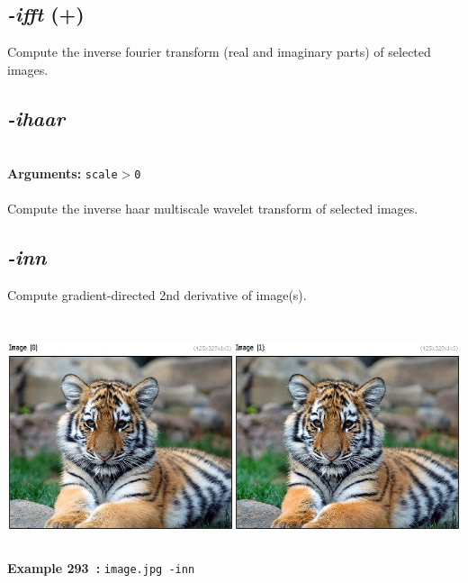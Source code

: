 \documentclass[a4paper,11pt,twoside]{book}
\begin{document}
\subsection{\emph{-ifft} (+)}\vspace*{-0.5em}
Compute the inverse fourier transform (real and imaginary parts) of selected images.


\subsection{\emph{-ihaar} }\vspace*{-0.5em}
~\\\textbf{Arguments: } 
{\small \texttt{scale$>$0}}\\~\\
Compute the inverse haar multiscale wavelet transform of selected images.


\subsection{\emph{-inn} }\vspace*{-0.5em}
Compute gradient-directed 2nd derivative of image(s).
\begin{center}\includegraphics[keepaspectratio=true,height=7cm,width=\textwidth]{img/gmic_def293.jpg}\\
{\footnotesize \textbf{Example 293~:} \texttt{image.jpg -inn}}
\end{center}
\end{document}
